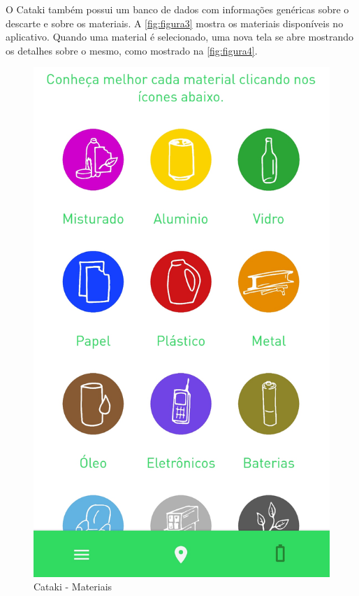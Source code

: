 \documentclass[
	12pt,				%
	openany,			%
	twoside,			%
	a4paper,			%
	english,			%
	french,				%
	spanish,			%
	brazil				%
	]{abntex2}
\begin{document}
\newpage
O Cataki também possui um banco de dados com informações genéricas sobre o descarte e sobre os materiais. A \autoref{fig:figura3} mostra os materiais disponíveis no aplicativo. Quando uma material é selecionado, uma nova tela se abre mostrando os detalhes sobre o mesmo, como mostrado na \autoref{fig:figura4}. \\
     \begin{figure}[htb]    
 \centering
  \begin{minipage}{0.45\textwidth}
    \centering
    \caption{Cataki - Materiais}
    \includegraphics[scale=0.15]{media/catakimateriais.png}   

\end{minipage}
\end{figure}
\end{document}

